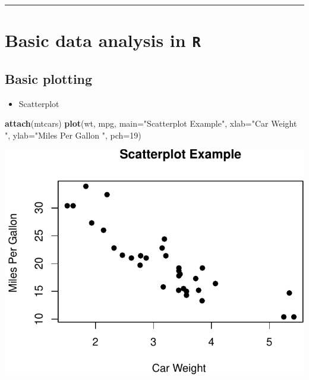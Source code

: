 \documentclass[]{article}
\def\tightlist{}
\newenvironment{Shaded}{\begin{snugshade}}{\end{snugshade}}
\newcommand{\KeywordTok}[1]{\textcolor[rgb]{0.13,0.29,0.53}{\textbf{{#1}}}}
\newcommand{\DataTypeTok}[1]{\textcolor[rgb]{0.13,0.29,0.53}{{#1}}}
\newcommand{\DecValTok}[1]{\textcolor[rgb]{0.00,0.00,0.81}{{#1}}}
\newcommand{\StringTok}[1]{\textcolor[rgb]{0.31,0.60,0.02}{{#1}}}
\newcommand{\NormalTok}[1]{{#1}}
\numberwithin{equation}{section}
\begin{document}
\begin{center}\rule{0.5\linewidth}{\linethickness}\end{center}

\section{\texorpdfstring{Basic data analysis in
\texttt{R}}{Basic data analysis in R}}\label{basic-data-analysis-in-r}

\subsection{Basic plotting}\label{basic-plotting}

\begin{itemize}
\tightlist
\item
  Scatterplot
\end{itemize}

\begin{Shaded}
\begin{Highlighting}[]
\KeywordTok{attach}\NormalTok{(mtcars)}
\KeywordTok{plot}\NormalTok{(wt, mpg, }\DataTypeTok{main=}\StringTok{"Scatterplot Example"}\NormalTok{,}
   \DataTypeTok{xlab=}\StringTok{"Car Weight "}\NormalTok{, }\DataTypeTok{ylab=}\StringTok{"Miles Per Gallon "}\NormalTok{, }\DataTypeTok{pch=}\DecValTok{19}\NormalTok{) }
\end{Highlighting}
\end{Shaded}

\includegraphics{index_files/figure-latex/unnamed-chunk-60-1.pdf}
\end{document}
